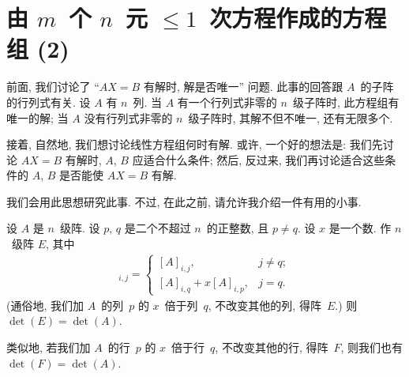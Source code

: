 \section{\texorpdfstring{由 \(m\)~个 \(n\)~元
      \({\leq} 1\)~次方程作成的方程组 (2)}%
  {由 m 个 n 元 ≤1 次方程作成的方程组 (2)}}

\maldevigalegajxo

前面, 我们讨论了
``\(AX = B\) 有解时, 解是否唯一''
问题.
此事的回答跟 \(A\)~的子阵的行列式有关.
设 \(A\) 有 \(n\)~列.
当 \(A\) 有一个行列式非零的 \(n\)~级子阵时,
此方程组有唯一的解;
当 \(A\) 没有行列式非零的 \(n\)~级子阵时,
其解不但不唯一, 还有无限多个.

接着, 自然地, 我们想讨论线性方程组何时有解.
或许, 一个好的想法是:
我们先讨论 \(AX = B\) 有解时,
\(A\), \(B\) 应适合什么条件;
然后, 反过来,
我们再讨论适合这些条件的 \(A\), \(B\)
是否能使 \(AX = B\) 有解.

我们会用此思想研究此事.
不过, 在此之前, 请允许我介绍一件有用的小事.

\begin{theorem}
    设 \(A\) 是 \(n\)~级阵.
    设 \(p\), \(q\) 是二个不超过 \(n\)~的正整数,
    且 \(p \neq q\).
    设 \(x\) 是一个数.
    作 \(n\)~级阵 \(E\), 其中
    \begin{align*}
        [E]_{i,j}
        = \begin{cases}
              [A]_{i,j},              & j \neq q; \\
              [A]_{i,q} + x[A]_{i,p}, & j = q.
          \end{cases}
    \end{align*}
    (通俗地,
    我们加 \(A\)~的列~\(p\) 的 \(x\)~倍于列~\(q\),
    不改变其他的列,
    得阵~\(E\).)
    则 \(\det {(E)} = \det {(A)}\).

    类似地,
    若我们加 \(A\)~的行~\(p\) 的 \(x\)~倍于行~\(q\),
    不改变其他的行,
    得阵~\(F\),
    则我们也有 \(\det {(F)} = \det {(A)}\).
\end{theorem}

